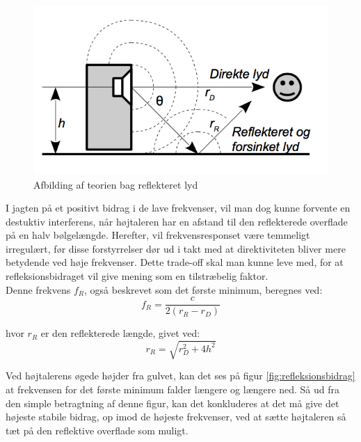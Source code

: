 \begin{figure}[h!]
	\centering
	\includegraphics[width=.4\textwidth]{Pics/reflect}
	\caption{Afbilding af teorien bag reflekteret lyd \cite{Elektroakustik} } 
	\label{fig:reflect}
\end{figure}

I jagten på et positivt bidrag i de lave frekvenser, vil man dog kunne forvente en destuktiv interferens, når højtaleren har en afstand til den reflekterede overflade på en halv bølgelængde. Herefter, vil frekvensresponset være temmeligt irregulært, før disse forstyrrelser dør ud i takt med at direktiviteten bliver mere betydende ved høje frekvenser. Dette trade-off skal man kunne leve med, for at refleksionsbidraget vil give mening som en tilstræbelig faktor.\\

Denne frekvens \textbf{$f_R$}, også beskrevet som det første minimum, beregnes ved:\\
\begin{equation}\label{lign:fR}
	f_R=\frac{c}{2(r_R-r_D)}
\end{equation}

hvor $r_R$ er den reflekterede længde, givet ved:
\begin{equation}
	r_R=\sqrt{r_D^2+4h^2}
\end{equation}


Ved højtalerens øgede højder fra gulvet, kan det ses på figur \ref{fig:refleksionsbidrag} at frekvensen for det første minimum falder længere og længere ned. Så ud fra den simple betragtning af denne figur, kan det konkluderes at det må give det højeste stabile bidrag, op imod de højeste frekvenser, ved at sætte højtaleren så tæt på den reflektive overflade som muligt.

